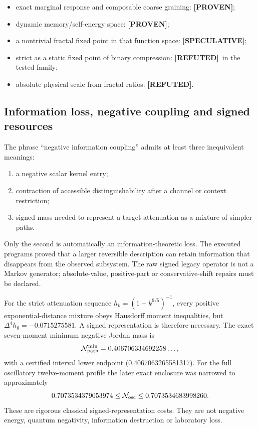 \documentclass[11pt,a4paper]{article}
\theoremstyle{definition}
\theoremstyle{remark}
\newcommand{\status}[2]{\textcolor{#1}{\textbf{[#2]}}}
\newcommand{\proven}{\status{fingreen}{PROVEN}}
\newcommand{\speculative}{\status{finpurple}{SPECULATIVE}}
\newcommand{\refuted}{\status{finred}{REFUTED}}
\begin{document}
\begin{itemize}
\item exact marginal response and composable coarse graining: \proven;
\item dynamic memory/self-energy space: \proven;
\item a nontrivial fractal fixed point in that function space: \speculative;
\item strict as a static fixed point of binary compression: \refuted\ in the tested family;
\item absolute physical scale from fractal ratios: \refuted.
\end{itemize}

\subsection{Information loss, negative coupling and signed resources}

The phrase ``negative information coupling'' admits at least three inequivalent meanings:

\begin{enumerate}
\item a negative scalar kernel entry;
\item contraction of accessible distinguishability after a channel or context restriction;
\item signed mass needed to represent a target attenuation as a mixture of simpler paths.
\end{enumerate}

Only the second is automatically an information-theoretic loss. The executed programs proved that a larger reversible description can retain information that disappears from the observed subsystem. The raw signed legacy operator is not a Markov generator; absolute-value, positive-part or conservative-shift repairs must be declared.

For the strict attenuation sequence $h_k=(1+k^{9/5})^{-1}$, every positive exponential-distance mixture obeys Hausdorff moment inequalities, but $\Delta^4 h_0=-0.0715275581$. A signed representation is therefore necessary. The exact seven-moment minimum negative Jordan mass is
\[
\mathcal N_{\rm path}^{\min}=0.406706334692258\ldots,
\]
with a certified interval lower endpoint (0.4067063265581317). For the full oscillatory twelve-moment profile the later exact enclosure was narrowed to approximately
\[
0.7073534379053974\le\mathcal N_{\rm osc}\le0.7073534683998260.
\]
These are rigorous classical signed-representation costs. They are not negative energy, quantum negativity, information destruction or laboratory loss.
\end{document}
